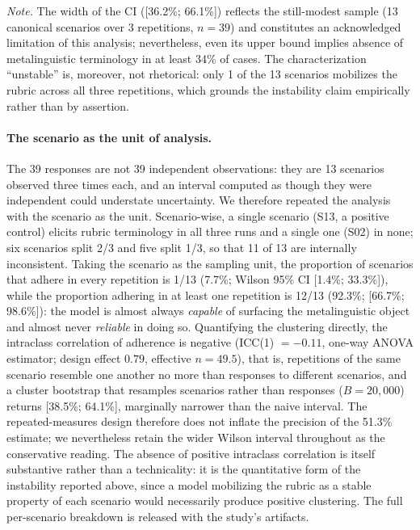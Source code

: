 \documentclass{sbc2023}%
\begin{document}
\noindent\textit{Note.} The width of the CI ([36.2\%; 66.1\%]) reflects the still-modest sample (13 canonical scenarios over 3 repetitions, $n=39$) and constitutes an acknowledged limitation of this analysis; nevertheless, even its upper bound implies absence of metalinguistic terminology in at least 34\% of cases. The characterization ``unstable'' is, moreover, not rhetorical: only 1 of the 13 scenarios mobilizes the rubric across all three repetitions, which grounds the instability claim empirically rather than by assertion.

\paragraph{The scenario as the unit of analysis.} The 39 responses are not 39 independent observations: they are 13 scenarios observed three times each, and an interval computed as though they were independent could understate uncertainty. We therefore repeated the analysis with the scenario as the unit. Scenario-wise, a single scenario (S13, a positive control) elicits rubric terminology in all three runs and a single one (S02) in none; six scenarios split 2/3 and five split 1/3, so that 11 of 13 are internally inconsistent. Taking the scenario as the sampling unit, the proportion of scenarios that adhere in every repetition is 1/13 (7.7\%; Wilson 95\% CI [1.4\%; 33.3\%]), while the proportion adhering in at least one repetition is 12/13 (92.3\%; [66.7\%; 98.6\%]): the model is almost always \textit{capable} of surfacing the metalinguistic object and almost never \textit{reliable} in doing so. Quantifying the clustering directly, the intraclass correlation of adherence is negative (ICC(1) $= -0.11$, one-way ANOVA estimator; design effect $0.79$, effective $n = 49.5$), that is, repetitions of the same scenario resemble one another no more than responses to different scenarios, and a cluster bootstrap that resamples scenarios rather than responses ($B = 20{,}000$) returns [38.5\%; 64.1\%], marginally narrower than the naive interval. The repeated-measures design therefore does not inflate the precision of the 51.3\% estimate; we nevertheless retain the wider Wilson interval throughout as the conservative reading. The absence of positive intraclass correlation is itself substantive rather than a technicality: it is the quantitative form of the instability reported above, since a model mobilizing the rubric as a stable property of each scenario would necessarily produce positive clustering. The full per-scenario breakdown is released with the study's artifacts.
\end{document}
